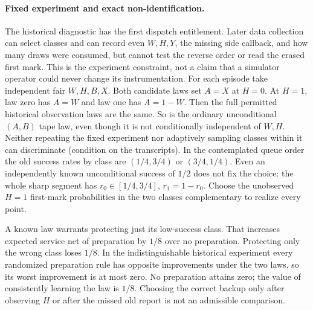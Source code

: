 \documentclass[11pt]{article}
\begin{document}
\paragraph{Fixed experiment and exact non-identification.}
The historical diagnostic has the first dispatch entitlement.
Later data collection can select classes and can record even
\(W,H,Y\), the missing side callback, and how many draws were
consumed, but cannot test the reverse order or read the erased
first mark. This is the experiment constraint, not a claim that
a simulator operator could never change its instrumentation.
For each episode take independent fair \(W,H,B,X\).
Both candidate laws set \(A=X\) at \(H=0\). At \(H=1\),
law zero has \(A=W\) and law one has \(A=1-W\). Then the full
permitted historical observation laws are the same. So is the
ordinary unconditional \((A,B)\) tape law, even though it is
not conditionally independent of \(W,H\). Neither repeating
the fixed experiment nor adaptively sampling classes within
it can discriminate (condition on the transcripts).
In the contemplated queue order the old success rates by
class are \((1/4,3/4)\) or \((3/4,1/4)\).
Even an independently known unconditional success of \(1/2\)
does not fix the choice: the whole sharp segment has
\(r_0\in[1/4,3/4]\), \(r_1=1-r_0\).
Choose the unobserved \(H=1\) first-mark probabilities in the
two classes complementary to realize every point.

A known law warrants protecting just its low-success class.
That increases expected service net of preparation by \(1/8\)
over no preparation. Protecting only the wrong class loses \(1/8\).
In the indistinguishable historical experiment every randomized
preparation rule has opposite improvements under the two laws,
so its worst improvement is at most zero. No preparation attains
zero; the value of consistently learning the law is \(1/8\).
Choosing the correct backup only after observing \(H\) or after
the missed old report is not an admissible comparison.
\end{document}
